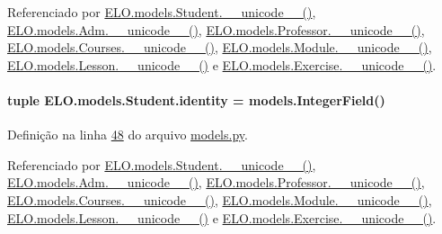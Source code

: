 Referenciado por \hyperlink{classELO_1_1models_1_1Student_a2f51785c1beb3b45269a8678d97ec783}{E\-L\-O.\-models.\-Student.\-\_\-\-\_\-unicode\-\_\-\-\_\-()}, \hyperlink{classELO_1_1models_1_1Adm_a3541c3ae12b8d2da3f44ac6be00a23e6}{E\-L\-O.\-models.\-Adm.\-\_\-\-\_\-unicode\-\_\-\-\_\-()}, \hyperlink{classELO_1_1models_1_1Professor_aefc9d63d429e19ec3487a7879879f29d}{E\-L\-O.\-models.\-Professor.\-\_\-\-\_\-unicode\-\_\-\-\_\-()}, \hyperlink{classELO_1_1models_1_1Courses_a8926a37152be8d4fc3e0ba6af200f871}{E\-L\-O.\-models.\-Courses.\-\_\-\-\_\-unicode\-\_\-\-\_\-()}, \hyperlink{classELO_1_1models_1_1Module_a1b54aa7a5e8dac090dea0926eca5550d}{E\-L\-O.\-models.\-Module.\-\_\-\-\_\-unicode\-\_\-\-\_\-()}, \hyperlink{classELO_1_1models_1_1Lesson_a3d9f0295dbe1ed5c74668d6c0876f97c}{E\-L\-O.\-models.\-Lesson.\-\_\-\-\_\-unicode\-\_\-\-\_\-()} e \hyperlink{classELO_1_1models_1_1Exercise_af3e991e5610cec815a2c3260ec6aae0b}{E\-L\-O.\-models.\-Exercise.\-\_\-\-\_\-unicode\-\_\-\-\_\-()}.

\hypertarget{classELO_1_1models_1_1Student_a20a7789a2b0f5b7d0c98453dcf38bc4e}{
\paragraph[{identity}]{\setlength{\rightskip}{0pt plus 5cm}tuple E\-L\-O.\-models.\-Student.\-identity = models.\-Integer\-Field()\hspace{0.3cm}{\ttfamily [static]}}}\label{classELO_1_1models_1_1Student_a20a7789a2b0f5b7d0c98453dcf38bc4e}


Definição na linha \hyperlink{ELO_2models_8py_source_l00048}{48} do arquivo \hyperlink{ELO_2models_8py_source}{models.\-py}.



Referenciado por \hyperlink{classELO_1_1models_1_1Student_a2f51785c1beb3b45269a8678d97ec783}{E\-L\-O.\-models.\-Student.\-\_\-\-\_\-unicode\-\_\-\-\_\-()}, \hyperlink{classELO_1_1models_1_1Adm_a3541c3ae12b8d2da3f44ac6be00a23e6}{E\-L\-O.\-models.\-Adm.\-\_\-\-\_\-unicode\-\_\-\-\_\-()}, \hyperlink{classELO_1_1models_1_1Professor_aefc9d63d429e19ec3487a7879879f29d}{E\-L\-O.\-models.\-Professor.\-\_\-\-\_\-unicode\-\_\-\-\_\-()}, \hyperlink{classELO_1_1models_1_1Courses_a8926a37152be8d4fc3e0ba6af200f871}{E\-L\-O.\-models.\-Courses.\-\_\-\-\_\-unicode\-\_\-\-\_\-()}, \hyperlink{classELO_1_1models_1_1Module_a1b54aa7a5e8dac090dea0926eca5550d}{E\-L\-O.\-models.\-Module.\-\_\-\-\_\-unicode\-\_\-\-\_\-()}, \hyperlink{classELO_1_1models_1_1Lesson_a3d9f0295dbe1ed5c74668d6c0876f97c}{E\-L\-O.\-models.\-Lesson.\-\_\-\-\_\-unicode\-\_\-\-\_\-()} e \hyperlink{classELO_1_1models_1_1Exercise_af3e991e5610cec815a2c3260ec6aae0b}{E\-L\-O.\-models.\-Exercise.\-\_\-\-\_\-unicode\-\_\-\-\_\-()}.

